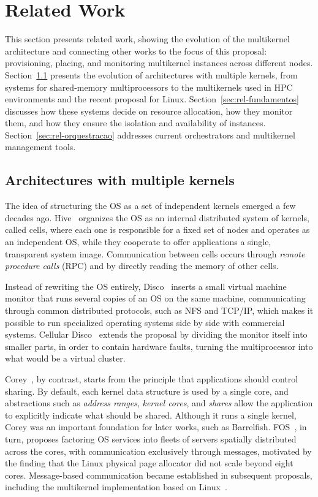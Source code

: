 \documentclass[12pt]{article}
\begin{document}
\section{Related Work} \label{sec:related}

This section presents related work, showing the evolution of the multikernel architecture and connecting other
works to the focus of this proposal: provisioning, placing, and monitoring multikernel instances across different nodes.
Section~\ref{sec:rel-multikernel} presents the evolution of architectures with multiple kernels, from systems for
shared-memory multiprocessors to the multikernels used in HPC environments and the recent proposal for
Linux.
Section~\ref{sec:rel-fundamentos} discusses how these systems decide on resource allocation, how they
monitor them, and how they ensure the isolation and availability of instances.
Section~\ref{sec:rel-orquestracao} addresses current orchestrators and multikernel management tools.

\subsection{Architectures with multiple kernels} \label{sec:rel-multikernel}

The idea of structuring the OS as a set of independent kernels emerged a few decades ago.
Hive~\cite{chapin1995hive} organizes the OS as an internal distributed system of kernels, called cells,
where each one is responsible for a fixed set of nodes and operates as an independent OS, while they cooperate
to offer applications a single, transparent system image.
Communication between cells occurs through \textit{remote procedure calls} (RPC) and by directly reading the memory of other cells.

Instead of rewriting the OS entirely, Disco~\cite{bugnion1997disco} inserts a small virtual machine monitor
that runs several copies of an OS on the same machine, communicating through common distributed protocols, such as NFS and
TCP/IP, which makes it possible to run specialized operating systems side by side with commercial systems.
Cellular Disco~\cite{govil2000cellular} extends the proposal by dividing the monitor itself into smaller parts, in order to
contain hardware faults, turning the multiprocessor into what would be a virtual cluster.

Corey~\cite{boydwickizer2008corey}, by contrast, starts from the principle that applications should control sharing.
By default, each kernel data structure is used by a single core, and abstractions such as \textit{address ranges},
\textit{kernel cores}, and \textit{shares} allow the application to explicitly indicate what should be shared.
Although it runs a single kernel, Corey was an important foundation for later works, such as Barrelfish.
FOS~\cite{wentzlaff2009fos}, in turn, proposes factoring OS services into fleets of servers spatially distributed
across the cores, with communication exclusively through messages, motivated by the finding that the
Linux physical page allocator did not scale beyond eight cores.
Message-based communication became established in subsequent proposals, including the multikernel implementation based on
Linux~\cite{wang2025multikernel}.
\end{document}
